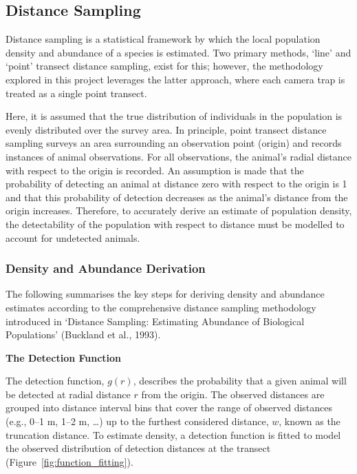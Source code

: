\subsection{Distance Sampling}

Distance sampling is a statistical framework by which the local population density and abundance
of a species is estimated.
Two primary methods, `line' and `point' transect distance sampling,\cite{distance_sampling_applications}
exist for this; however, the methodology explored in this project leverages the latter approach,
where each camera trap is treated as a single point transect.

Here, it is assumed that the true distribution of individuals in the population is evenly distributed
over the survey area.\cite{distance_samping}
In principle, point transect distance sampling surveys an area surrounding an observation point
(origin) and records instances of animal observations.
For all observations, the animal's radial distance with respect to the origin is recorded.
An assumption is made that the probability of detecting an animal at distance zero with respect to
the origin is 1 and that this probability of detection decreases as the animal's distance from the
origin increases.\cite{ds_design}
Therefore, to accurately derive an estimate of population density, the detectability of the population
with respect to distance must be modelled to account for undetected animals.

\subsubsection{Density and Abundance Derivation}

The following summarises the key steps for deriving density and abundance estimates according
to the comprehensive distance sampling methodology introduced in `Distance Sampling: Estimating Abundance
of Biological Populations' (Buckland et al., 1993).\cite{distance_samping}

\vspace{5mm}
\textbf{The Detection Function}

The detection function, $g(r)$, describes the probability that a given animal will be detected
at radial distance $r$ from the origin.
The observed distances are grouped into distance interval bins that cover the range of observed distances
(e.g., 0–1 m, 1–2 m, \ldots) up to the furthest considered distance, $w$, known as the truncation distance.
To estimate density, a detection function is fitted to model the observed distribution of detection
distances at the transect (Figure~\ref{fig:function_fitting}).


